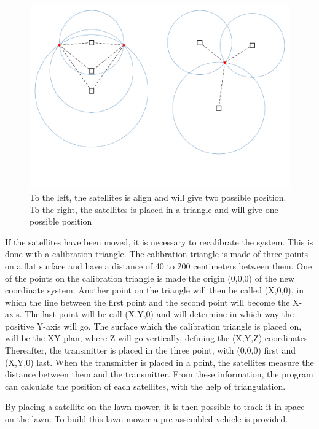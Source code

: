 \begin{figure}[H]
	\centering
	\includegraphics[scale=0.5]{figures/GoT_SingleVsTriangle.pdf}
	\caption{To the left, the satellites is align and will give two possible position. To the right, the satellites is placed in a triangle and will give one possible position}
	\label{GoTTriVSLine}
\end{figure}
If the satellites have been moved, it is necessary to recalibrate the system. This is done with a calibration triangle. The calibration triangle is made of three points on a flat surface and have a distance of 40 to 200 centimeters between them. One of the points on the calibration triangle is made the origin (0,0,0) of the new coordinate system. Another point on the triangle will then be called (X,0,0), in which the line between the first point and the second point will become the X-axis. The last point will be call (X,Y,0) and will determine in which way the positive Y-axis will go. The surface which the calibration triangle is placed on, will be the XY-plan, where Z will go vertically, defining the (X,Y,Z) coordinates. Thereafter, the transmitter is placed in the three point, with (0,0,0) first and (X,Y,0) last. When the transmitter is placed in a point, the satellites measure the distance between them and the transmitter. From these information, the program can calculate the position of each satellites, with the help of triangulation.

By placing a satellite on the lawn mower, it is then possible to track it in space on the lawn. To build this lawn mower a pre-assembled vehicle is provided.
